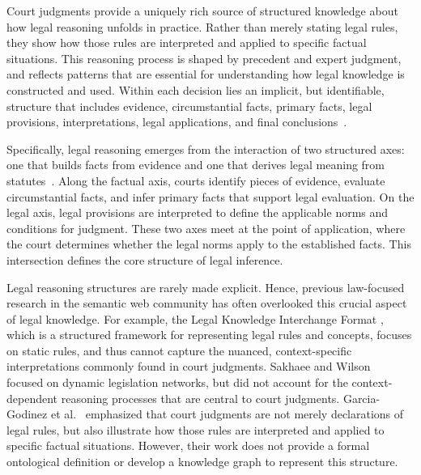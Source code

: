 \documentclass[11pt]{article}
\begin{document}
Court judgments provide a uniquely rich source of structured knowledge about how legal reasoning unfolds in practice. Rather than merely stating legal rules, they show how those rules are interpreted and applied to specific factual situations. This reasoning process is shaped by precedent and expert judgment, and reflects patterns that are essential for understanding how legal knowledge is constructed and used. Within each decision lies an implicit, but identifiable, structure that includes evidence, circumstantial facts, primary facts, legal provisions, interpretations, legal applications, and final conclusions~\cite{kondo2024collaborative}.

Specifically, legal reasoning emerges from the interaction of two structured axes: one that builds facts from evidence and one that derives legal meaning from statutes~\cite{kondo2024collaborative,leubsdorf2001structure,sieckmann2020dual,strong2015writing,yao2025elevating}. Along the factual axis, courts identify pieces of evidence, evaluate circumstantial facts, and infer primary facts that support legal evaluation. On the legal axis, legal provisions are interpreted to define the applicable norms and conditions for judgment. These two axes meet at the point of application, where the court determines whether the legal norms apply to the established facts. This intersection defines the core structure of legal inference. 



Legal reasoning structures are rarely made explicit. Hence, previous law-focused research in the semantic web community has often overlooked this crucial aspect of legal knowledge. For example, the Legal Knowledge Interchange Format \cite{Hoekstra2007LKIF}, which is a structured framework for representing legal rules and concepts, focuses on static rules, and thus cannot capture the nuanced, context-specific interpretations commonly found in court judgments. Sakhaee and Wilson~\cite{Sakhaee2021LegislationNetwork} focused on dynamic legislation networks, but did not account for the context-dependent reasoning processes that are central to court judgments. Garcia-Godinez et al.~\cite{garcia-godinezDeflationaryApproachLegal2024} emphasized that court judgments are not merely declarations of legal rules, but also illustrate how those rules are interpreted and applied to specific factual situations. However, their work does not provide a formal ontological definition or develop a knowledge graph to represent this structure.
\end{document}
